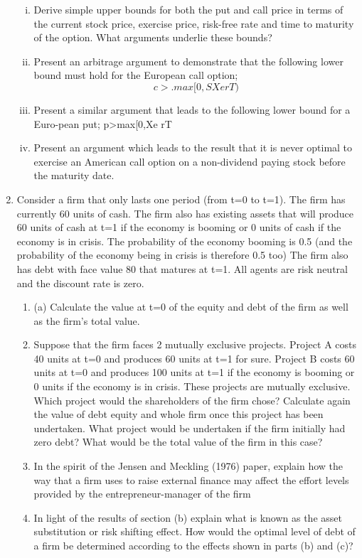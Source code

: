 \documentclass[a4paper,12pt]{article}
\begin{document}
\begin{enumerate}
\begin{enumerate}[(i)]
    \item  Derive simple upper bounds for both the put and call price in terms of the current stock price, exercise price, risk-free rate and time to maturity of the option. What arguments underlie these bounds? 
\item Present an arbitrage argument to demonstrate that the following lower bound must hold for the European call option; 
$$c>. max[0, S Xe rT) $$
\item  Present a similar argument that leads to the following lower bound for a Euro-pean put; 
p>max[0,Xe rT 
\item  Present an argument which leads to the result that it is never optimal to exercise an American call option on a non-dividend paying stock before the maturity date.  
\end{enumerate}
\item Consider a firm that only lasts one period (from t=0 to t=1). The firm has currently 60 units of cash. The firm also has existing assets that will produce 60 units of cash at t=1 if the economy is booming or 0 units of cash if the economy is in crisis. The probability of the economy booming is 0.5 (and the probability of the economy being in crisis is therefore 0.5 too) The firm also has debt with face value 80 that matures at t=1. All agents are risk neutral and the discount rate is zero. 
\begin{enumerate}
    \item (a) Calculate the value at t=0 of the equity and debt of the firm as well as the firm's total value.  
    \item  Suppose that the firm faces 2 mutually exclusive projects. Project A costs 40 units at t=0 and produces 60 units at t=1 for sure. Project B costs 60 units at t=0 and produces 100 units at t=1 if the economy is booming or 0 units if the economy is in crisis. These projects are mutually exclusive. Which project would the shareholders of the firm chose? Calculate again the value of debt equity and whole firm once this project has been undertaken. What project would be undertaken if the firm initially had zero debt? What would be the total value of the firm in this case?  
    \item In the spirit of the Jensen and Meckling (1976) paper, explain how the way that a firm uses to raise external finance may affect the effort levels provided by the entrepreneur-manager of the firm  
    \item In light of the results of section (b) explain what is known as the asset substitution or risk shifting effect. How would the optimal level of debt of a firm be determined according to the effects shown in parts (b) and (c)?  
\end{enumerate}



\end{enumerate}
\end{document}
